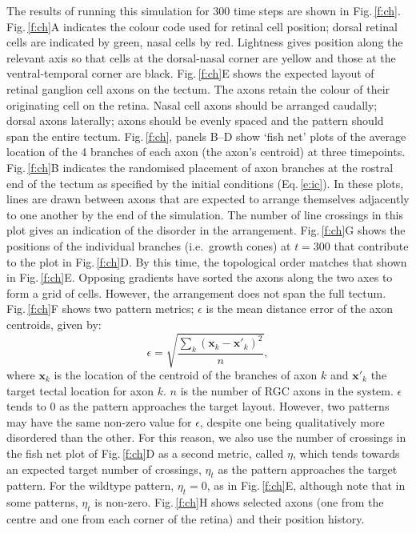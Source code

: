 \documentclass[11pt, a4paper]{article}
\begin{document}
The results of running this simulation for 300 time steps are shown in
Fig.\,\ref{f:ch}. Fig.\,\ref{f:ch}A indicates the colour code used for retinal
cell position; dorsal retinal cells are indicated by green, nasal cells by
red. Lightness gives position along the relevant axis so that cells at the
dorsal-nasal corner are yellow and those at the ventral-temporal corner are
black. Fig.\,\ref{f:ch}E shows the expected layout of retinal ganglion cell
axons on the tectum. The axons retain the colour of their originating cell on
the retina. Nasal cell axons should be arranged
caudally; dorsal axons laterally; axons should be evenly spaced and the
pattern should span the entire tectum.  Fig.\,\ref{f:ch}, panels B--D show
`fish net' plots of the average location of the 4 branches of each axon (the
axon's centroid) at three timepoints. Fig.\,\ref{f:ch}B indicates the
randomised placement of axon branches at the rostral end of the tectum as
specified by the initial conditions (Eq.\,\ref{e:ic}). In these plots, lines are drawn between
axons that are expected to arrange themselves adjacently to one another by the
end of the simulation. The number of line crossings in this plot gives an
indication of the disorder in the arrangement. Fig.\,\ref{f:ch}G shows the positions of the individual branches
(i.e.~growth cones) at $t=300$ that contribute to the plot in
Fig.\,\ref{f:ch}D. By this time, the topological order matches that shown in
Fig.\,\ref{f:ch}E. Opposing gradients have sorted the axons along the two axes
to form a grid of cells. However, the arrangement does not span the full
tectum. Fig.\,\ref{f:ch}F shows two pattern metrics; $\epsilon$ is the mean
distance error of the axon centroids, given by:
%
\begin{equation}\label{e:eps}
\epsilon = \sqrt{\frac{\sum_k (\mathbf{x}_{k} - \mathbf{x}'_{k})^2}{n}},
\end{equation}
%
where $\mathbf{x}_{k}$ is the location of the centroid of the
branches of axon $k$ and $\mathbf{x}'_{k}$ the target tectal location for axon
$k$. $n$ is the number of RGC axons in the system.
%
$\epsilon$ tends to 0 as the pattern approaches the target layout. However,
two patterns may have the same non-zero value for $\epsilon$, despite one
being qualitatively more disordered than the other. For this reason, we also
use the number of crossings in the fish net plot of Fig.\,\ref{f:ch}D as a
second metric, called $\eta$, which tends towards an expected target number of
crossings, $\eta_t$ as the pattern approaches the target pattern.  For the wildtype
pattern, $\eta_t=0$, as in Fig.\,\ref{f:ch}E, although note that in some patterns,
$\eta_t$ is non-zero. Fig.\,\ref{f:ch}H shows selected
axons (one from the centre and one from each corner of the retina) and their
position history.
\end{document}
